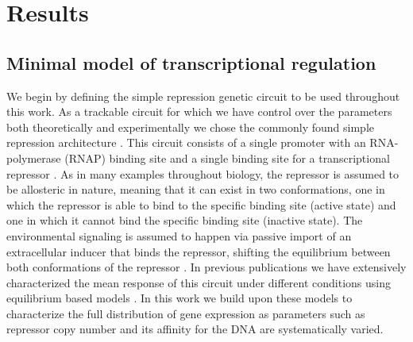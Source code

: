 \section{Results}

\subsection{Minimal model of transcriptional regulation}

We begin by defining the simple repression genetic circuit to be used throughout
this work. As a trackable circuit for which we have control over the parameters
both theoretically and experimentally we chose the commonly found simple
repression architecture \cite{Rydenfelt2014}. This circuit consists of a single
promoter with an RNA-polymerase (RNAP) binding site and a single binding site
for a transcriptional repressor \cite{Garcia2011c}. As in many examples
throughout biology, the repressor is assumed to be allosteric in nature, meaning
that it can exist in two conformations, one in which the repressor is able to
bind to the specific binding site (active state) and one in which it cannot bind
the specific binding site (inactive state). The environmental signaling is
assumed to happen via passive import of an extracellular inducer that binds the
repressor, shifting the equilibrium between both conformations of the repressor
\cite{Razo-Mejia2018}. In previous publications we have extensively
characterized the mean response of this circuit under different conditions using
equilibrium based models . In this work we build upon
these models to characterize the full distribution of gene expression as
parameters such as repressor copy number and its affinity for the DNA are
systematically varied.

